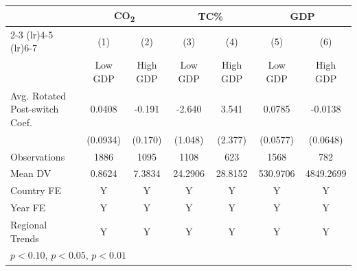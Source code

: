 \begin{tabular}{l*{6}{c}}
\hline
& \multicolumn{2}{c}{CO\textsubscript{2}} & \multicolumn{2}{c}{TC\%} & \multicolumn{2}{c}{GDP} \\
\cmidrule(lr){2-3} \cmidrule(lr){4-5} \cmidrule(lr){6-7}
            &\multicolumn{1}{c}{(1)}&\multicolumn{1}{c}{(2)}&\multicolumn{1}{c}{(3)}&\multicolumn{1}{c}{(4)}&\multicolumn{1}{c}{(5)}&\multicolumn{1}{c}{(6)}\\
            &\multicolumn{1}{c}{Low GDP}&\multicolumn{1}{c}{High GDP}&\multicolumn{1}{c}{Low GDP}&\multicolumn{1}{c}{High GDP}&\multicolumn{1}{c}{Low GDP}&\multicolumn{1}{c}{High GDP}\\
\hline
Avg. Rotated Post-switch Coef.&      0.0408         &      -0.191         &      -2.640\sym{**} &       3.541         &      0.0785         &     -0.0138         \\
            &    (0.0934)         &     (0.170)         &     (1.048)         &     (2.377)         &    (0.0577)         &    (0.0648)         \\
\midrule
Observations&        1886         &        1095         &        1108         &         623         &        1568         &         782         \\
Mean DV     &      0.8624         &      7.3834         &     24.2906         &     28.8152         &    530.9706         &   4849.2699         \\
Country FE  &           Y         &           Y         &           Y         &           Y         &           Y         &           Y         \\
Year FE     &           Y         &           Y         &           Y         &           Y         &           Y         &           Y         \\
Regional Trends&           Y         &           Y         &           Y         &           Y         &           Y         &           Y         \\
\hline
\multicolumn{7}{l}{\footnotesize \sym{*} \(p<0.10\), \sym{**} \(p<0.05\), \sym{***} \(p<0.01\)}\\
\end{tabular}
